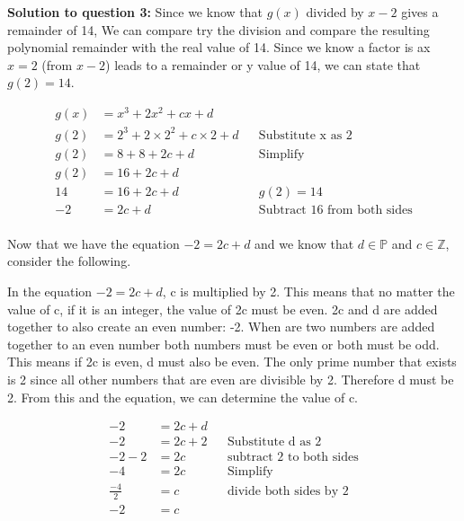 \documentclass[12pt]{book}
\begin{document}
\begin{enumerate}
\vspace{0.3cm} 
\textbf{Solution to question 3:}
\vspace{0.5 cm}
 Since we know that $g(x)$ divided by $x-2$ gives a remainder of 14,
 We can compare try the division and compare the resulting polynomial remainder
with the real value of 14. Since we know a factor is ax $x=2$ (from $x-2$) leads 
to a remainder or y value of 14, we can state that $g(2) = 14$.

\begin{align*}
    g(x) &= x^3 + 2x^2 + cx + d \\
    g(2) &= 2^3 + 2\times 2^2 + c\times 2 + d && \text{Substitute x as 2}\\
    g(2) &= 8 + 8 + 2c + d && \text{Simplify}\\
    g(2) &= 16 + 2c + d \\
    14 &= 16 + 2c + d && g(2) = 14\\
    -2 &= 2c + d && \text{Subtract 16 from both sides}\\
\end{align*}

\vspace{-1cm}

Now that we have the equation $-2 = 2c + d$ and we know that $d \in \mathbb{P}$ and $c \in \mathbb{Z}$, consider the following.

In the equation $-2 = 2c + d$, c is multiplied by 2. This means 
that no matter the value of c, if it is an integer, the value 
of 2c must be even. 2c and d are added together to also create 
an even number: -2. When are two numbers are added together to 
an even number both numbers must be even or both must be odd. 
This means if 2c is even, d must also be even. The only prime 
number that exists is 2 since all other numbers that are even 
are divisible by 2. Therefore d must be 2. From this and the 
equation, we can determine the value of c.

\vspace{-0.6cm}

\begin{align*}
    -2 &= 2c + d \\
    -2 &= 2c + 2 && \text{Substitute d as 2} \\
    -2 - 2 &= 2c && \text{subtract 2 to both sides}\\
    -4 &= 2c && \text{Simplify} \\
    \frac{-4}{2} &= c && \text{divide both sides by 2} \\
    -2 &= c
\end{align*}


\end{enumerate}
\end{document}
